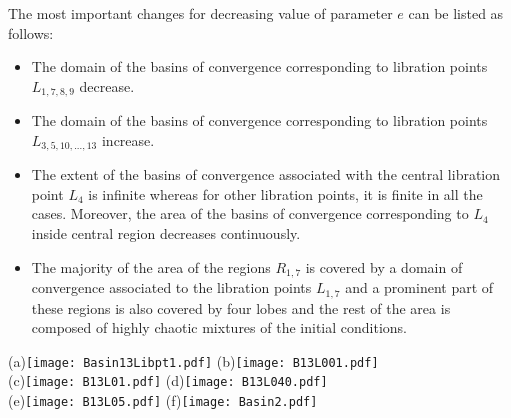 \documentclass[preprint,fleqn,5p,numbers,sort&compress]{elsarticle}
\begin{document}
The most important changes for decreasing value of parameter $e$
can be listed as follows:
\begin{itemize}
  \item The domain of the basins of convergence corresponding to
  libration points $L_{1, 7, 8, 9}$ decrease.
  \item The domain of the basins of convergence corresponding to
  libration points $L_{3, 5, 10,...,13}$ increase.
  \item The extent of the basins of convergence associated with the
  central libration point $L_4$ is infinite whereas for other libration
  points, it is finite in all the cases.  Moreover, the area of the basins
  of convergence corresponding to $L_4$ inside central region decreases
  continuously.
  \item The majority of the area of the regions $R_{1,7}$ is covered by a
  domain of convergence associated to the libration points $L_{1,7}$ and
  a prominent part of these regions is also covered by four lobes and the rest
  of the area is composed of highly chaotic mixtures of the initial conditions.
  \end{itemize}
\begin{figure*}\label{Fig:9}
\begin{center}
(a)\texttt{[image: Basin13Libpt1.pdf]}%
(b)\texttt{[image: B13L001.pdf]}\\%
(c)\texttt{[image: B13L01.pdf]}%
(d)\texttt{[image: B13L040.pdf]}\\%
(e)\texttt{[image: B13L05.pdf]}%
(f)\texttt{[image: Basin2.pdf]}%
\caption{The Newton-Raphson basins of attraction on the $xy$-plane for the case when thirteen libration points exist for:  (a) $e=-0.05$; (b) $e=-0.1$; (c) $e=-0.125$; (d) $e=-0.165$ ; (e) $e=-0.171$; (f) $e=-0.1731$. The color code denoting the attractors is as follows: $L_1$ (\emph{yellow}); $L_2$ (\emph{Darker blue}); $L_3$ (\emph{gray}); $L_4$ (\emph{green}); $L_5$ (\emph{red}); $L_6$ (\emph{blue}); $L_7$ (\emph{cyan}); $L_8$ (\emph{purple}); $L_9$ (\emph{crimson}); $L_{10}$ (\emph{teal}); $L_{11}$ (\emph{magenta}); $L_{12}$ (\emph{orange}); $L_{13}$ (\emph{light green}) and non-converging points (\emph{white}). The black dots show the position of the libration points.}
\end{center}
\end{figure*}
\end{document}
